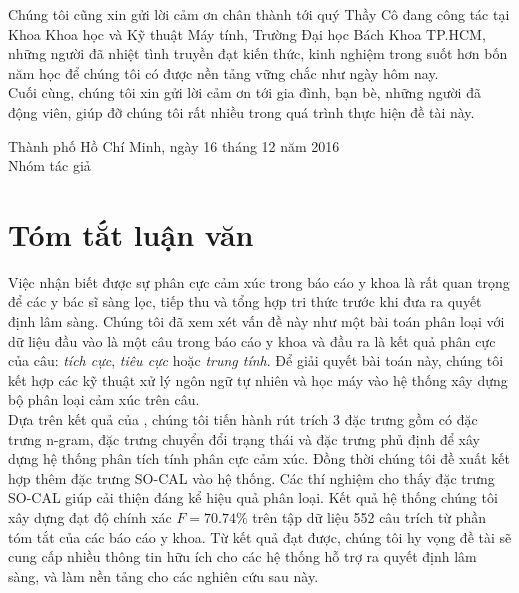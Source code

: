 \documentclass[a4paper, 12pt]{article}
\theoremstyle{definition}
\newcommand{\tichcuc}{\textit{tích cực}\xspace}
\newcommand{\tieucuc}{\textit{tiêu cực}\xspace}
\newcommand{\trungtinh}{\textit{trung tính}\xspace}
\begin{document}
Chúng tôi cũng xin gửi lời cảm ơn chân thành tới quý Thầy Cô đang công tác tại Khoa Khoa học và Kỹ thuật Máy tính, Trường Đại học Bách Khoa TP.HCM, những người đã nhiệt tình truyền đạt kiến thức, kinh nghiệm trong suốt hơn bốn năm học để chúng tôi có được nền tảng vững chắc như ngày hôm nay.\\

Cuối cùng, chúng tôi xin gửi lời cảm ơn tới gia đình, bạn bè, những người đã động viên, giúp đỡ chúng tôi rất nhiều trong quá trình thực hiện đề tài này.\\

\begin{flushright}
Thành phố Hồ Chí Minh, ngày 16 tháng 12 năm 2016\\

Nhóm tác giả
\end{flushright}

\pagebreak
\section*{Tóm tắt luận văn}
Việc nhận biết được sự phân cực cảm xúc trong báo cáo y khoa là rất quan trọng để các y bác sĩ sàng lọc, tiếp thu và tổng hợp tri thức trước khi đưa ra quyết định lâm sàng. Chúng tôi đã xem xét vấn đề này như một bài toán phân loại với dữ liệu đầu vào là một câu trong báo cáo y khoa và đầu ra là kết quả phân cực của câu: \tichcuc, \tieucuc hoặc \trungtinh. Để giải quyết bài toán này, chúng tôi kết hợp các kỹ thuật xử lý ngôn ngữ tự nhiên và học máy vào hệ thống xây dựng bộ phân loại cảm xúc trên câu.\\

Dựa trên kết quả của \cite{niu2005analysis}, chúng tôi tiến hành rút trích 3 đặc trưng gồm có đặc trưng n-gram, đặc trưng chuyển đổi trạng thái và đặc trưng phủ định để xây dựng hệ thống phân tích tính phân cực cảm xúc. Đồng thời chúng tôi đề xuất kết hợp thêm đặc trưng SO-CAL vào hệ thống. Các thí nghiệm cho thấy đặc trưng SO-CAL giúp cải thiện đáng kể hiệu quả phân loại. Kết quả hệ thống chúng tôi xây dựng đạt độ chính xác $F=70.74\%$ trên tập dữ liệu 552 câu trích từ phần tóm tắt của các báo cáo y khoa. Từ kết quả đạt được, chúng tôi hy vọng đề tài sẽ cung cấp nhiều thông tin hữu ích cho các hệ thống hỗ trợ ra quyết định lâm sàng, và làm nền tảng cho các nghiên cứu sau này.

\pagebreak
\tableofcontents

\thispagestyle{empty}
\pagebreak
\listoffigures
\pagebreak
\listoftables
\end{document}
